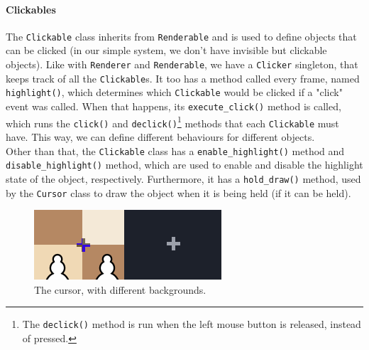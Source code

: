 \documentclass[a4paper, 11pt, twocolumn]{IEEEtran}
\begin{document}
    \paragraph*{Clickables} The \texttt{Clickable} class inherits from \texttt{Renderable} and is used to define objects that can be clicked (in our simple system, we don't have invisible but clickable objects). Like with \texttt{Renderer} and \texttt{Renderable}, we have a \texttt{Clicker} singleton, that keeps track of all the \texttt{Clickable}s. It too has a method called every frame, named \texttt{highlight()}, which determines which \texttt{Clickable} would be clicked if a "click" event was called. When that happens, its \texttt{execute\_click()} method is called, which runs the \texttt{click()} and \texttt{declick()}\footnote{The \texttt{declick()} method is run when the left mouse button is released, instead of pressed.} methods that each \texttt{Clickable} must have. This way, we can define different behaviours for different objects.\\Other than that, the \texttt{Clickable} class has a \texttt{enable\_highlight()} method and \texttt{disable\_highlight()} method, which are used to enable and disable the highlight state of the object, respectively. Furthermore, it has a \texttt{hold\_draw()} method, used by the \texttt{Cursor} class to draw the object when it is being held (if it can be held).
    \begin{figure}
        \centering
        \includegraphics[width=.45\textwidth]{images/cursor_comparison.png}
        \caption{The cursor, with different backgrounds.}
        \label{fig:cursor}
    \end{figure}
\end{document}
